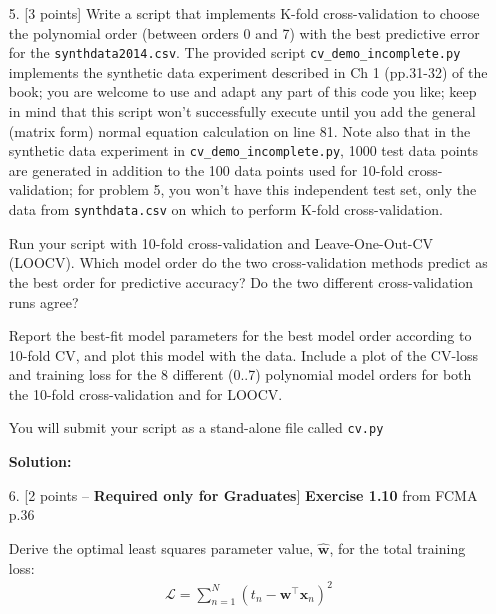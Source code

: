\documentclass[10pt]{article}
\begin{document}
\begin{itemize}
\item[5.] [3 points]
Write a script that implements K-fold cross-validation to choose the polynomial order (between orders 0 and 7) with the best predictive error for the {\tt synthdata2014.csv}.  The provided script {\tt cv\_demo\_incomplete.py} implements the synthetic data experiment described in Ch 1 (pp.31-32) of the book; you are welcome to use and adapt any part of this code you like; keep in mind that this script won't successfully execute until you add the general (matrix form) normal equation calculation on line 81.
Note also that in the synthetic data experiment in {\tt cv\_demo\_incomplete.py}, 1000 test data points are generated in addition to the 100 data points used for 10-fold cross-validation; for problem 5, you won't have this independent test set, only the data from {\tt synthdata.csv} on which to perform K-fold cross-validation.

Run your script with 10-fold cross-validation and Leave-One-Out-CV (LOOCV).
Which model order do the two cross-validation methods predict as the best order for predictive accuracy?
Do the two different cross-validation runs agree?

Report the best-fit model parameters for the best model order according to 10-fold CV, and plot this model with the data.
Include a plot of the CV-loss and training loss for the 8 different (0..7) polynomial model orders for both the 10-fold cross-validation and for LOOCV.

You will submit your script as a stand-alone file called {\tt cv.py}

{\bf Solution:} 



\newpage
\item[6.] [2 points -- {\bf Required only for Graduates}] 
{\bf Exercise 1.10} from FCMA p.36

Derive the optimal least squares parameter value, $\mathbf{\hat{w}}$, for the total training loss:
\begin{eqnarray*}
\mathcal{L} = \sum_{n=1}^N \left( t_n - \mathbf{w}^\top \mathbf{x}_n \right)^2
\end{eqnarray*}


\end{itemize}
\end{document}

